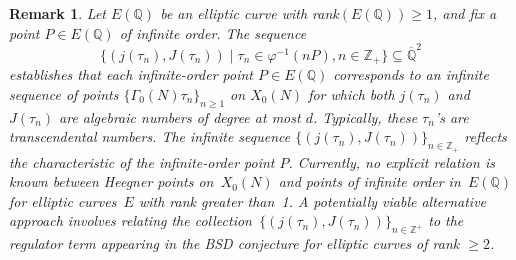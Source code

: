 \documentclass[10pt, a4paper]{article}
\newtheorem{remark}[theorem]{Remark}
\begin{document}
\begin{remark}
Let $E(\mathbb{Q})$ be an elliptic curve with rank$(E(\mathbb{Q}))  \geqslant 1$, and fix a point $P \in E(\mathbb{Q})$ of infinite order.
The sequence
 \begin{equation}\{(j(\tau_n), J(\tau_n)) \mid \tau_n \in \varphi^{-1}(nP), n \in \mathbb{Z}_+ \} \subseteq \overline{\mathbb{Q}}^2\end{equation}
establishes that each infinite-order point  \(P\in E(\mathbb{Q}) \) corresponds to an infinite sequence of points \(\{ \Gamma_0(N)\tau_n\}_{n \geq 1} \) on \( X_0(N) \)   for which both  \( j(\tau_n) \) and \( J(\tau_n) \) are algebraic numbers of degree at most $d$.
 Typically,  these \( \tau_n \)'s  are transcendental numbers. The infinite sequence
$\{ (j(\tau_n), J(\tau_n)) \}_{n \in \mathbb{Z}_+}  $
reflects the characteristic  of the infinite-order point \( P \).
Currently,  no explicit relation is known between Heegner points on~\( X_0(N) \) and points of infinite order in~\( E(\mathbb{Q}) \) for elliptic curves~\( E \) with rank greater than~1. A potentially viable alternative approach involves relating the collection~$\{ (j(\tau_n), J(\tau_n)) \}_{n \in \mathbb{Z}^+} $ to the regulator term appearing in the BSD conjecture  for elliptic curves of rank $\geq 2$.
\end{remark}
\end{document}
